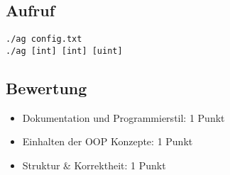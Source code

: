 \documentclass[a4paper,10pt]{article}
\begin{document}
\subsection*{Aufruf}
\texttt{./ag config.txt}\\
\texttt{./ag [int] [int] [uint]}

\subsection*{Bewertung}
\begin{itemize}
 \item Dokumentation und Programmierstil: 1 Punkt
 \item Einhalten der OOP Konzepte: 1 Punkt
 \item Struktur \& Korrektheit: 1 Punkt
\end{itemize}

\newpage
\end{document}
